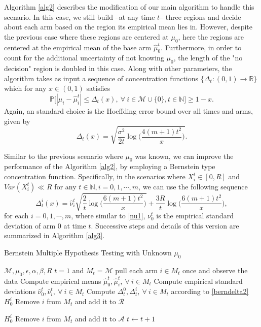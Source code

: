\documentclass[12pt]{article}
\def\P{\mathbb{P}}
\def\R{\mathbb{R}}
\def\N{\mathbb{N}}
\def\N{\mathbb{N}}
\def\MM{\mathcal{M}}
\def\RR{\mathcal{R}}
\def\AA{\mathcal{A}}
\begin{document}
Algorithm \ref{alg2} describes the modification of our main algorithm to handle this scenario. In this case, we  still build --at any time $t$--  three regions  and decide about each arm based on the region its empirical mean lies in. However, despite the previous case where these regions are centered at $\mu_0$, here the regions are centered at the empirical mean of the base arm $\hat\mu^t_0$. Furthermore, in order to count for the additional uncertainty of not knowing $\mu_0$, the length of the "no decision" region is doubled in this case. Along with other parameters, the algorithm takes as input a sequence of concentration functions $\{\Delta_t:(0,1)\to\R\}$ which for any $x\in (0,1)$ satisfies  
$$\P\big[|\mu_i-\hat\mu_i^t|\leq\Delta_t(x),~\forall~i\in\MM\cup\{0\},t\in \mathbb{N}\big]\geq 1-x.$$
Again, an standard choice is the Hoeffding error bound over all times and arms, given by
\begin{equation}
\label{hofDelta2}
\Delta_t(x) = \sqrt{\frac{\sigma^2}{2t}\log\Big(\frac{4(m+1)t^2}{x}\Big)}.
\end{equation}

Similar to the previous scenario where  $\mu_0$ was known, we can improve the performance of the Algorithm \ref{alg2}, by employing a Bernstein type concentration function. Specifically, in the scenarios where  $X^t_i\in[0,R]$  and $Var(X^t_i)\ll R$ for any $t\in\N, i=0,1,\cdots,m$, we can use the following   sequence
\begin{equation}
\label{berndelta2}
\Delta_t^i(x) = \hat\nu_i^t\sqrt{\frac{2}{t}\log\Big(\frac{6(m+1)t^2}{x}\Big)} + \frac{3R}{t}\log\Big(\frac{6(m+1)t^2}{x}\Big),
\end{equation}
for each $i = 0,1,\cdots,m$, where similar to \eqref{nu1}, $\nu^t_0$ is the empirical standard deviation of arm 0 at time $t$. Successive steps and details of this version are summarized in Algorithm \ref{alg3}.

\begin{algorithm}[tb]
   \caption{Bernstein Multiple Hypothesis Testing with Unknown $\mu_0$}
   \label{alg3}
\begin{algorithmic}
    $\MM,\mu_0,\epsilon,\alpha,\beta,R$
    $t=1$ and $M_t = \MM$
   \STATE pull each arm $i\in M_t$ once and observe the data
   \STATE Compute empirical means $\hat\mu_0^t,\hat\mu^t_i,~\forall~i\in M_t$
   \STATE Compute empirical standard deviations $\hat\nu_0^t,\hat\nu^t_i,~\forall~i\in M_t$
   \STATE Compute $\Delta^0_t,\Delta^i_t,~\forall~i\in M_t$ according to \eqref{berndelta2}
  		 $H_0^i$
  		\STATE Remove $i$ from $M_t$ and add it to $\RR$
  	\ENDIF
  	
  		 $H_0^i$
  		\STATE Remove $i$ from $M_t$ and add it to $\AA$
  	\ENDIF
  \ENDFOR
  \STATE $t \leftarrow t+1$
   \ENDWHILE
   
\end{algorithmic}
\end{algorithm} 
\end{document}
